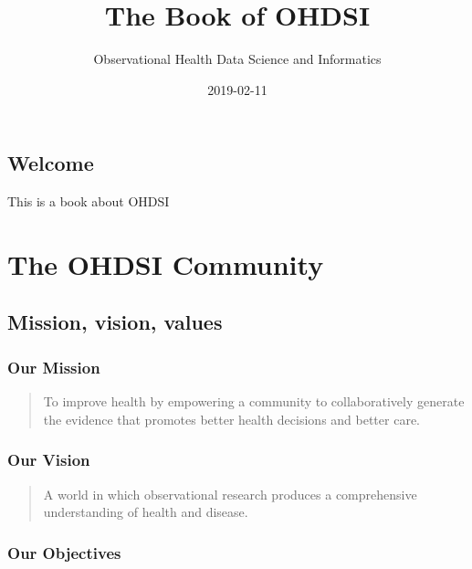 \documentclass[]{book}
\title{The Book of OHDSI}
\author{Observational Health Data Science and Informatics}
\date{2019-02-11}
\begin{document}
\maketitle

{
\setcounter{tocdepth}{1}
\tableofcontents
}
\chapter*{Welcome}\label{welcome}

 This is a book about OHDSI

\part{The OHDSI Community}\label{part-the-ohdsi-community}

\chapter{Mission, vision, values}\label{MissionVissionValues}

\section{Our Mission}\label{our-mission}

\begin{quote}
To improve health by empowering a community to collaboratively generate
the evidence that promotes better health decisions and better care.
\end{quote}

\section{Our Vision}\label{our-vision}

\begin{quote}
A world in which observational research produces a comprehensive
understanding of health and disease.
\end{quote}

\section{Our Objectives}\label{our-objectives}
\end{document}
